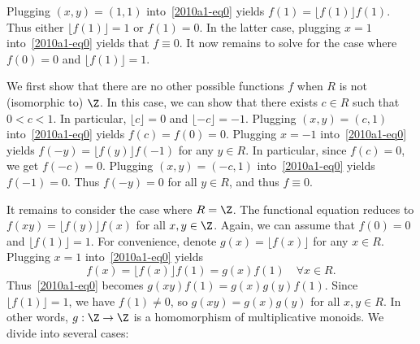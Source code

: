 Plugging $(x, y) = (1, 1)$ into~\eqref{2010a1-eq0} yields $f(1) = \lfloor f(1) \rfloor f(1)$.
Thus either $\lfloor f(1) \rfloor = 1$ or $f(1) = 0$.
In the latter case, plugging $x = 1$ into~\eqref{2010a1-eq0} yields that $f \equiv 0$.
It now remains to solve for the case where $f(0) = 0$ and $\lfloor f(1) \rfloor = 1$.

We first show that there are no other possible functions $f$ when $R$ is not (isomorphic to) $\Z$.
In this case, we can show that there exists $c \in R$ such that $0 < c < 1$.
In particular, $\lfloor c \rfloor = 0$ and $\lfloor -c \rfloor = -1$.
Plugging $(x, y) = (c, 1)$ into~\eqref{2010a1-eq0} yields $f(c) = f(0) = 0$.
Plugging $x = -1$ into~\eqref{2010a1-eq0} yields $f(-y) = \lfloor f(y) \rfloor f(-1)$ for any $y \in R$.
In particular, since $f(c) = 0$, we get $f(-c) = 0$.
Plugging $(x, y) = (-c, 1)$ into~\eqref{2010a1-eq0} yields $f(-1) = 0$.
Thus $f(-y) = 0$ for all $y \in R$, and thus $f \equiv 0$.

It remains to consider the case where $R = \Z$.
The functional equation reduces to $f(xy) = \lfloor f(y) \rfloor f(x)$ for all $x, y \in \Z$.
Again, we can assume that $f(0) = 0$ and $\lfloor f(1) \rfloor = 1$.
For convenience, denote $g(x) = \lfloor f(x) \rfloor$ for any $x \in R$.
Plugging $x = 1$ into~\eqref{2010a1-eq0} yields
\[ f(x) = \lfloor f(x) \rfloor f(1) = g(x) f(1) \quad \forall x \in R. \tag{1}\label{2010a1-eq1} \]
Thus~\eqref{2010a1-eq0} becomes $g(xy) f(1) = g(x) g(y) f(1)$.
Since $\lfloor f(1) \rfloor = 1$, we have $f(1) \neq 0$, so $g(xy) = g(x) g(y)$ for all $x, y \in R$.
In other words, $g : \Z \to \Z$ is a homomorphism of multiplicative monoids.
We divide into several cases:

